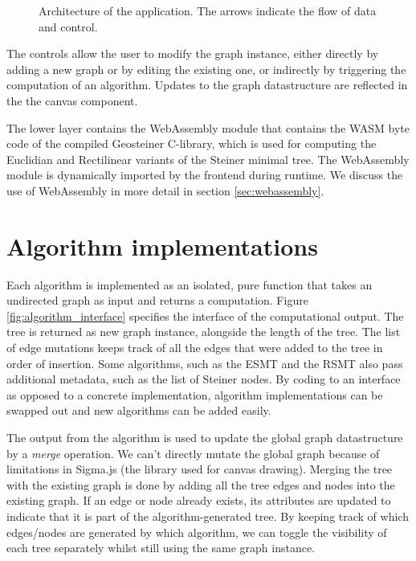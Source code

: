 \documentclass{l4proj}
\begin{document}
\begin{figure}[h]
    \centering
    
    \caption{Architecture of the application. The arrows indicate the flow of data and control.}
    \label{fig:architecture}
\end{figure}

The controls allow the user to modify the graph instance, either directly by adding a new graph or by editing the existing one, or indirectly by triggering the computation of an algorithm.
Updates to the graph datastructure are reflected in the the canvas component.

The lower layer contains the WebAssembly module that contains the WASM byte code of the compiled Geosteiner C-library, which is used for computing the Euclidian and Rectilinear variants of the Steiner minimal tree. The WebAssembly module is dynamically imported by the frontend during runtime.
We discuss the use of WebAssembly in more detail in section \ref{sec:webassembly}.

\section{Algorithm implementations}

\begin{wrapstuff}[r,width=0.3\textwidth,type=figure]
    \centering
    \caption{Interface of the algorithm computational output.}
    
    \label{fig:algorithm_interface}
\end{wrapstuff}
Each algorithm is implemented as an isolated, pure function that takes an undirected graph as input and returns a computation.
Figure \ref{fig:algorithm_interface} specifies the interface of the computational output. The tree is returned as new graph instance, alongside the length of the tree. The list of edge mutations keeps track of all the edges that were added to the tree in order of insertion. Some algorithms, such as the ESMT and the RSMT also pass additional metadata, such as the list of Steiner nodes.
By coding to an interface as opposed to a concrete implementation, algorithm implementations can be swapped out and new algorithms can be added easily.

The output from the algorithm is used to update the global graph datastructure by a \textit{merge} operation. We can't directly mutate the global graph because of limitations in Sigma.js (the library used for canvas drawing).
Merging the tree with the existing graph is done by adding all the tree edges and nodes into the existing graph. If an edge or node already exists, its attributes are updated to indicate that it is part of the algorithm-generated tree. By keeping track of which edges/nodes are generated by which algorithm, we can toggle the visibility of each tree separately whilst still using the same graph instance.
\end{document}

